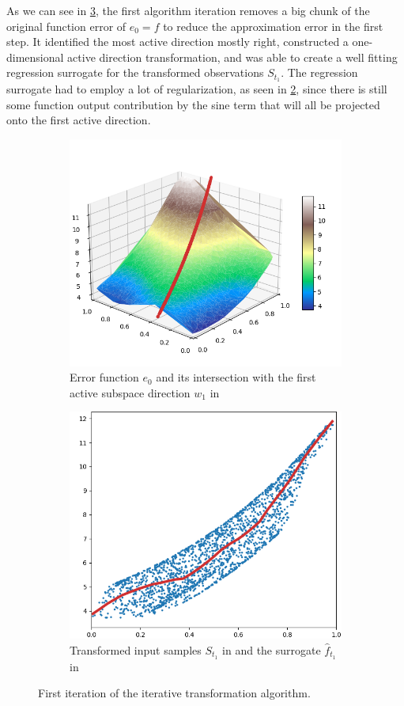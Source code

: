 \documentclass[
  a4paper,  %
  twoside,  %
  bibliography=totoc,
  headsepline,
  cleardoublepage=empty,
  parskip=half,
  draft=false
]{scrbook}
\begin{document}
As we can see in \cref{fig:pipeline_1}, the first algorithm iteration removes a big chunk of the original function error of $e_0=f$ to reduce the approximation error in the first step.
It identified the most active direction mostly right, constructed a one-dimensional active direction transformation, and was able to create a well fitting regression surrogate for the transformed observations $S_{t_1}$.
The regression surrogate had to employ a lot of regularization, as seen in \cref{fig:pipeline_local_1}, since there is still some function output contribution by the sine term that will all be projected onto the first active direction.
\begin{mdframed}[style=style]
\begin{figure}[H]
\begin{subfigure}{.5\textwidth}
  \centering
  \includegraphics[width=.8\linewidth]{graphics/pipeline_current_1.png}
  \caption{Error function $e_0$ and its intersection with the first active subspace direction $w_1$ in \reddot}
\label{fig:pipeline_current_1}
\end{subfigure}%
\begin{subfigure}{.5\textwidth}
  \centering
  \includegraphics[width=.8\linewidth]{graphics/pipeline_local_1.png}
  \caption{Transformed input samples $S_{t_1}$ in \blue and the surrogate $\hat{f}_{t_1}$ in \reddot}
\label{fig:pipeline_local_1}
\end{subfigure}
\delimit
\caption{First iteration of the iterative transformation algorithm.}
\label{fig:pipeline_1}
\end{figure}
\end{mdframed}
\end{document}
